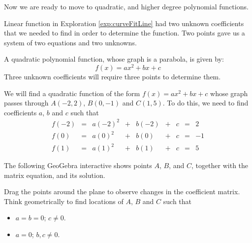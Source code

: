 \documentclass{ximera}
\begin{document}
Now we are ready to move to quadratic, and higher degree polynomial functions.

Linear function in Exploration \ref{exp:curveFitLine} had two unknown coefficients that we needed to find in order to determine the function. Two points gave us a system of two equations and two unknowns.

A quadratic polynomial function, whose graph is a parabola, is given by:
$$f(x)=ax^2+bx+c$$
Three unknown coefficients will require three points to determine them.

\begin{exploration}\label{exp:curveFitParabola}
We will find a quadratic function of the form $f(x)=ax^2+bx+c$ whose graph passes through $A(-2,2)$, $B(0, -1)$ and $C(1, 5)$.
To do this, we need to find coefficients $a$, $b$ and $c$ such that
$$\begin{matrix}f(-2)&=&a(-2)^2&+&b(-2)&+&c&=&2\\f(0)&=&a(0)^2&+&b(0)&+&c&=&-1\\f(1)&=&a(1)^2&+&b(1)&+&c&=&5\end{matrix}$$

The following GeoGebra interactive shows points $A$, $B$, and $C$, together with the matrix equation, and its solution.



\begin{onlineOnly}
\begin{center}
\end{center}
\end{onlineOnly}

Drag the points around the plane to observe changes in the coefficient matrix.  Think geometrically to find locations of $A$, $B$ and $C$ such that
\begin{itemize}
    \item $a=b=0$; $c\neq 0$.
    \item $a=0$; $b, c\neq 0$.
\end{itemize}


\end{exploration}
\end{document}
